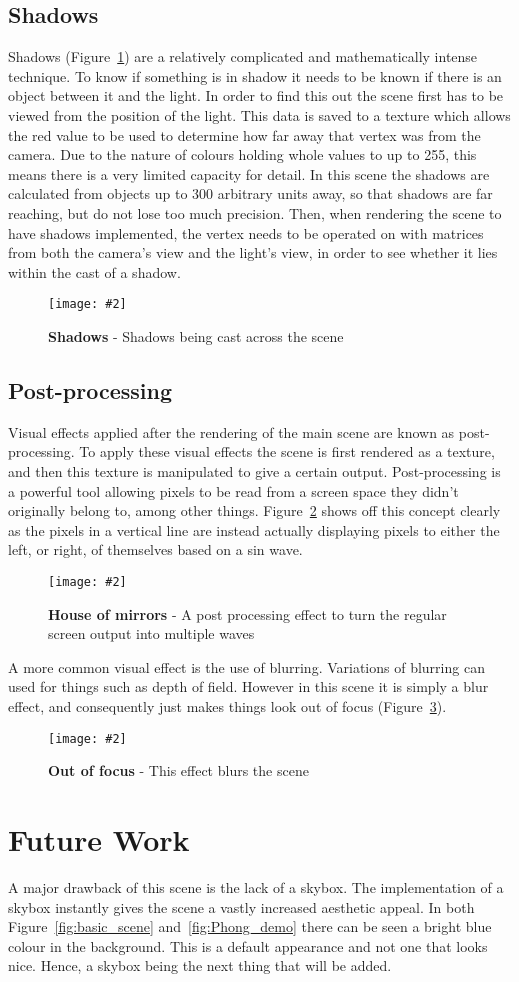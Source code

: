 \documentclass[10pt, a4paper]{article}
\newcommand{\figuremacro}[5]{
    \begin{figure}[#1]
        \centering
        \texttt{[image: \#2]}
        \caption[#3]{\textbf{#3}#4}
        \label{fig:#2}
    \end{figure}
}
\begin{document}
	\subsection{Shadows}
	Shadows (Figure~\ref{fig:shadows}) are a relatively complicated and mathematically intense technique.  To know if something is in shadow it needs to be known if there is an object between it and the light.  In order to find this out the scene first has to be viewed from the position of the light.  This data is saved to a texture which allows the red value to be used to determine how far away that vertex was from the camera.  Due to the nature of colours holding whole values to up to 255, this means there is a very limited capacity for detail.  In this scene the shadows are calculated from objects up to 300 arbitrary units away, so that shadows are far reaching, but do not lose too much precision.  Then, when rendering the scene to have shadows implemented, the vertex needs to be operated on with matrices from both the camera's view and the light's view, in order to see whether it lies within the cast of a shadow.
	\figuremacro{h}{shadows}{Shadows}{ - Shadows being cast across the scene}{1.0}
	
	\subsection{Post-processing}
	Visual effects applied after the rendering of the main scene are known as post-processing.  To apply these visual effects the scene is first rendered as a texture, and then this texture is manipulated to give a certain output. Post-processing is a powerful tool allowing pixels to be read from a screen space they didn't originally belong to, among other things.  Figure~\ref{fig:wiggle} shows off this concept clearly as the pixels in a vertical line are instead actually displaying pixels to either the left, or right, of themselves based on a sin wave.
	\figuremacro{h}{wiggle}{House of mirrors}{ - A post processing effect to turn the regular screen output into multiple waves}{1.0}
	
	A more common visual effect is the use of blurring.  Variations of blurring can used for things such as depth of field.  However in this scene it is simply a blur effect, and consequently just makes things look out of focus (Figure~\ref{fig:blur}).
	\figuremacro{h}{blur}{Out of focus}{ - This effect blurs the scene}{1.0}
	
	\section{Future Work}
	A major drawback of this scene is the lack of a skybox.  The implementation of a skybox instantly gives the scene a vastly increased aesthetic appeal.  In both Figure~\ref{fig:basic_scene} and~\ref{fig:Phong_demo} there can be seen a bright blue colour in the background.  This is a default appearance and not one that looks nice.  Hence, a skybox being the next thing that will be added.
	
\end{document}
